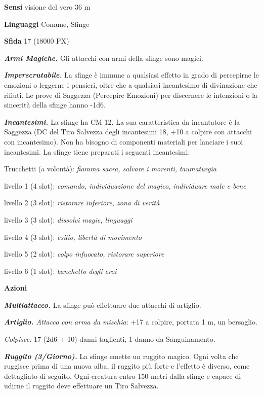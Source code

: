\begin{multicols}{2}
	\textbf{Sensi} visione del vero 36 m

	\textbf{Linguaggi} Comune, Sfinge

	\textbf{Sfida} 17 (18000 PX)

	\textit{\textbf{Armi Magiche.}} Gli attacchi con armi della sfinge sono magici.

	\textit{\textbf{Imperscrutabile.}} La sfinge è immune a qualsiasi effetto in grado di percepirne le emozioni o leggerne i pensieri, oltre che a qualsiasi incantesimo di divinazione che rifiuti. Le prove di Saggezza (Percepire Emozioni) per discernere le intenzioni o la sincerità della sfinge hanno -1d6.

	\textit{\textbf{Incantesimi.}} La sfinge ha CM 12.
	La sua caratteristica da incantatore è la Saggezza (DC del Tiro Salvezza degli incantesimi 18, +10 a colpire con attacchi con incantesimo). Non ha bisogno di componenti materiali per lanciare i suoi incantesimi. La sfinge tiene preparati i seguenti incantesimi:

	Trucchetti (a volontà): \textit{fiamma sacra, salvare i morenti,} \textit{taumaturgia}

	livello 1 (4 slot): \textit{comando, individuazione del magico,} \textit{individuare male e bene}

	livello 2 (3 slot): \textit{ristorare inferiore, zona di verità}

	livello 3 (3 slot): \textit{dissolvi magie, linguaggi}

	livello 4 (3 slot): \textit{esilio, libertà di movimento}

	livello 5 (2 slot): \textit{colpo infuocato, ristorare superiore}

	livello 6 (1 slot): \textit{banchetto degli eroi}

	\textbf{Azioni}

	\textit{\textbf{Multiattacco.}} La sfinge può effettuare due attacchi di artiglio.

	\textit{\textbf{Artiglio.} Attacco con arma da mischia}: +17 a colpire, portata 1 m, un bersaglio.

	\textit{Colpisce:} 17 (2d6 + 10) danni taglienti, 1 danno da Sanguinamento.

	\textit{\textbf{Ruggito (3/Giorno).}} La sfinge emette un ruggito magico. Ogni volta che ruggisce prima di una nuova alba, il ruggito più forte e l'effetto è diverso, come dettagliato di seguito. Ogni creatura entro 150 metri dalla sfinge e capace di udirne il ruggito deve effettuare un Tiro Salvezza.


\end{multicols}
